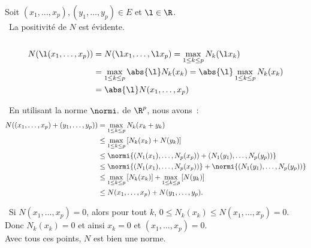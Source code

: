 Soit $(x_1,\ldots,x_p),(y_1,\ldots,y_p)\in E$ et $\l\in\R$.\\
\bu\ La positivité de $N$ est évidente.\\
\bu\ \begin{align*}
N(\l(x_1,\ldots,x_p))&=N(\l x_1,\ldots,\l x_p)=\max\limits_{1\leq k\leq p}N_k(\l x_k)\\
&=\max\limits_{1\leq k\leq p}\abs{\l}N_k(x_k)=\abs{\l}\max\limits_{1\leq k\leq p}N_k(x_k)\\
&=\abs{\l} N(x_1,\ldots,x_p)
\end{align*}

\bu\ En utilisant la norme $\normi .$ de $\R^p$, nous avons~:
\begin{align*}
N((x_1,\ldots,x_p)+(y_1,\ldots,y_p))&=\max\limits_{1\leq k\leq p}N_k(x_k+y_k)\\
&\leq \max\limits_{1\leq k\leq p}\left[N_k(x_k)+N(y_k)\right]\\
&\leq \normi{(N_1(x_1),\ldots,N_p(x_p))+(N_1(y_1),\ldots,N_p(y_p))}\\
&\leq \normi{(N_1(x_1),\ldots,N_p(x_p))}+\normi{(N_1(y_1),\ldots,N_p(y_p))}\\
&\leq \max\limits_{1\leq k\leq p}\left[N_k(x_k)\right]+\max\limits_{1\leq k\leq p}\left[N(y_k)\right]\\
&\leq N(x_1,\ldots,x_p)+N(y_1,\ldots,y_p).
\end{align*}

\bu\ Si $N(x_1,\ldots,x_p)=0$, alors pour tout $k$, $0\leq N_k(x_k)\leq N(x_1,\ldots,x_p)=0$. 
Donc $N_k(x_k)=0$ et ainsi $x_k=0$ et $(x_1,\ldots,x_p)=0$.\\

Avec tous ces points, $N$ est bien une norme.
